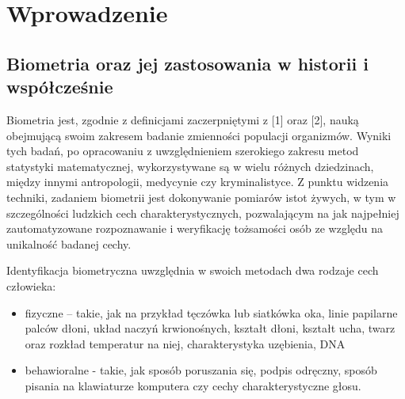 \chapter{Wprowadzenie}
\label{cha:wprowadzenie}


\section{Biometria oraz jej zastosowania w historii i współcześnie}
\label{sec:biometria}

Biometria jest, zgodnie z definicjami zaczerpniętymi z [1] oraz [2], nauką obejmującą swoim zakresem badanie zmienności populacji organizmów. Wyniki tych badań, po opracowaniu z uwzględnieniem szerokiego zakresu metod statystyki matematycznej, wykorzystywane są w wielu różnych dziedzinach, między innymi antropologii, medycynie czy kryminalistyce. Z punktu widzenia techniki, zadaniem biometrii jest dokonywanie pomiarów istot żywych, w tym w szczególności ludzkich cech charakterystycznych, pozwalającym na jak najpełniej zautomatyzowane rozpoznawanie i weryfikację tożsamości osób ze względu na unikalność badanej cechy.

Identyfikacja biometryczna uwzględnia w swoich metodach dwa rodzaje cech człowieka:
\begin{itemize} 
\item fizyczne – takie, jak na przykład tęczówka lub siatkówka oka, linie papilarne palców dłoni, układ naczyń krwionośnych, kształt dłoni, kształt ucha, twarz oraz rozkład temperatur na niej, charakterystyka uzębienia, DNA 
\item behawioralne - takie, jak sposób poruszania się, podpis odręczny, sposób pisania na klawiaturze komputera czy cechy charakterystyczne głosu.
\end{itemize}


